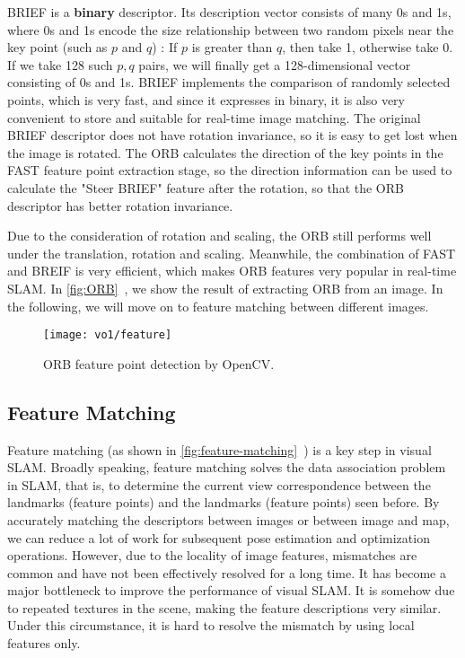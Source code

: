 BRIEF is a \textbf{binary} descriptor. Its description vector consists of many 0s and 1s, where 0s and 1s encode the size relationship between two random pixels near the key point (such as $p$ and $q$) : If $p$ is greater than $q$, then take 1, otherwise take 0. If we take 128 such $p,q$ pairs, we will finally get a 128-dimensional vector \textsuperscript{\cite{calonder2010brief}} consisting of 0s and 1s. BRIEF implements the comparison of randomly selected points, which is very fast, and since it expresses in binary, it is also very convenient to store and suitable for real-time image matching. The original BRIEF descriptor does not have rotation invariance, so it is easy to get lost when the image is rotated. The ORB calculates the direction of the key points in the FAST feature point extraction stage, so the direction information can be used to calculate the "Steer BRIEF" feature after the rotation, so that the ORB descriptor has better rotation invariance.

Due to the consideration of rotation and scaling, the ORB still performs well under the translation, rotation and scaling. Meanwhile, the combination of FAST and BREIF is very efficient, which makes ORB features very popular in real-time SLAM. In \autoref{fig:ORB}~, we show the result of extracting ORB from an image. In the following, we will move on to feature matching between different images.

\begin{figure}[!htp]
    \centering
    \texttt{[image: vo1/feature]}\\
    \caption{ORB feature point detection by OpenCV.}
    \label{fig:ORB}
\end{figure}

\subsection{Feature Matching}

Feature matching (as shown in \autoref{fig:feature-matching}~) is a key step in visual SLAM. Broadly speaking, feature matching solves the data association problem in SLAM, that is, to determine the current view correspondence between the landmarks (feature points) and the landmarks (feature points) seen before. By accurately matching the descriptors between images or between image and map, we can reduce a lot of work for subsequent pose estimation and optimization operations. However, due to the locality of image features, mismatches are common and have not been effectively resolved for a long time. It has become a major bottleneck to improve the performance of  visual SLAM. It is somehow due to repeated textures in the scene, making the feature descriptions very similar. Under this circumstance, it is hard to resolve the mismatch by using local features only.

